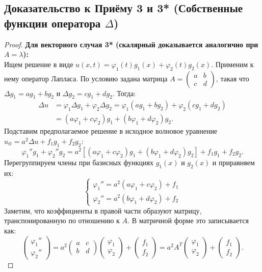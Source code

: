 \subsection*{Доказательство к Приёму 3 и 3* (Собственные функции оператора $\Delta$)}
\begin{proof}
\textbf{Для векторного случая 3* (скалярный доказывается аналогично при $A=\lambda$):} \\
Ищем решение в виде $u(x,t) = \varphi_1(t)g_1(x) + \varphi_2(t)g_2(x)$. Применим к нему оператор Лапласа. По условию задана матрица $A = \begin{pmatrix} a & b \\ c & d \end{pmatrix}$, такая что $\Delta g_1 = a g_1 + b g_2$ и $\Delta g_2 = c g_1 + d g_2$. Тогда:
\[
\begin{aligned}
\Delta u &= \varphi_1\Delta g_1 + \varphi_2\Delta g_2 = \varphi_1(ag_1 + bg_2) + \varphi_2(cg_1 + dg_2) \\
&= (a\varphi_1 + c\varphi_2)g_1 + (b\varphi_1 + d\varphi_2)g_2.
\end{aligned}
\]
Подставим предполагаемое решение в исходное волновое уравнение $u_{tt} = a^2 \Delta u + f_1 g_1 + f_2 g_2$:
\[
\varphi_1'' g_1 + \varphi_2'' g_2 = a^2 \left[ (a\varphi_1 + c\varphi_2)g_1 + (b\varphi_1 + d\varphi_2)g_2 \right] + f_1 g_1 + f_2 g_2.
\]
Перегруппируем члены при базисных функциях $g_1(x)$ и $g_2(x)$ и приравняем их:
\[
\begin{cases}
\varphi_1'' = a^2(a\varphi_1 + c\varphi_2) + f_1 \\
\varphi_2'' = a^2(b\varphi_1 + d\varphi_2) + f_2
\end{cases}
\]
Заметим, что коэффициенты в правой части образуют матрицу, транспонированную по отношению к $A$. В матричной форме это записывается как:
\[
\begin{pmatrix} \varphi_1'' \\ \varphi_2'' \end{pmatrix} = a^2 \begin{pmatrix} a & c \\ b & d \end{pmatrix} \begin{pmatrix} \varphi_1 \\ \varphi_2 \end{pmatrix} + \begin{pmatrix} f_1 \\ f_2 \end{pmatrix} = a^2 A^T \begin{pmatrix} \varphi_1 \\ \varphi_2 \end{pmatrix} + \begin{pmatrix} f_1 \\ f_2 \end{pmatrix}.
\]
\end{proof}

